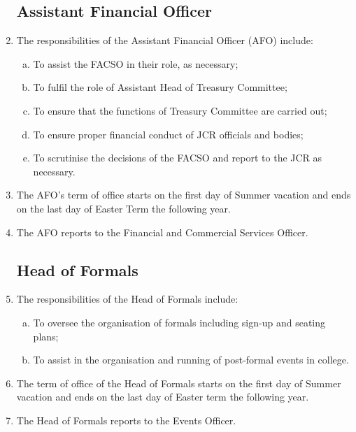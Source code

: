 \documentclass[12pt]{article}
\begin{document}
\begin{enumerate}
    \subsection{Assistant Financial Officer}
    \item The responsibilities of the Assistant Financial Officer (AFO) include:
    \begin{enumerate}[(a)]
        \item To assist the FACSO in their role, as necessary;
        \item To fulfil the role of Assistant Head of Treasury Committee;
        \item To ensure that the functions of Treasury Committee are carried out;
        \item To ensure proper financial conduct of JCR officials and bodies;
        \item To scrutinise the decisions of the FACSO and report to the JCR as necessary.
    \end{enumerate}
    \item The AFO's term of office starts on the first day of Summer vacation and ends on the last day of Easter Term the following year.
    \item The AFO reports to the Financial and Commercial Services Officer.
    \subsection{Head of Formals}
    \item The responsibilities of the Head of Formals include:
    \begin{enumerate} [(a)]
        \item To oversee the organisation of formals including sign-up and seating plans;
        \item To assist in the organisation and running of post-formal events in college.
    \end{enumerate}
    \item The term of office of the Head of Formals starts on the first day of Summer vacation and ends on the last day of Easter term the following year.
    \item The Head of Formals reports to the Events Officer.
    

\end{enumerate}
\end{document}

